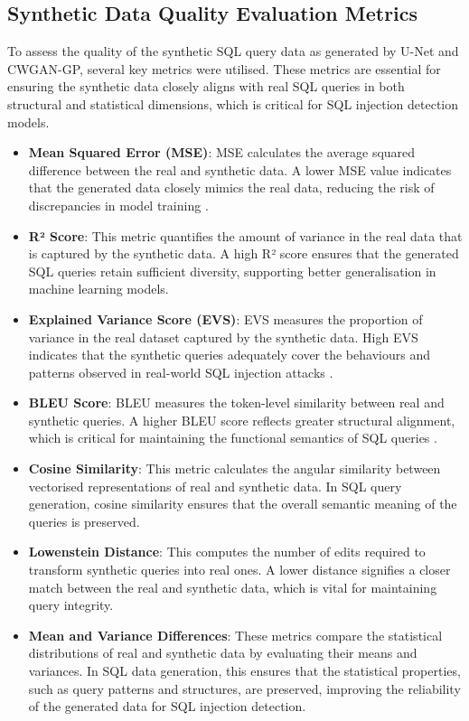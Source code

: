 \documentclass[journal]{IEEEtran}
\begin{document}
\subsection{Synthetic Data Quality Evaluation Metrics}

To assess the quality of the synthetic SQL query data as generated by U-Net and CWGAN-GP, several key metrics were utilised. These metrics are essential for ensuring the synthetic data closely aligns with real SQL queries in both structural and statistical dimensions, which is critical for SQL injection detection models.

\begin{itemize}
    \item \textbf{Mean Squared Error (MSE)}: MSE calculates the average squared difference between the real and synthetic data. A lower MSE value indicates that the generated data closely mimics the real data, reducing the risk of discrepancies in model training \cite{goldstein1999summarizing}.

    \item \textbf{R² Score}: This metric quantifies the amount of variance in the real data that is captured by the synthetic data. A high R² score ensures that the generated SQL queries retain sufficient diversity, supporting better generalisation in machine learning models.

    \item \textbf{Explained Variance Score (EVS)}: EVS measures the proportion of variance in the real dataset captured by the synthetic data. High EVS indicates that the synthetic queries adequately cover the behaviours and patterns observed in real-world SQL injection attacks \cite{goldstein1999summarizing}.

    \item \textbf{BLEU Score}: BLEU measures the token-level similarity between real and synthetic queries. A higher BLEU score reflects greater structural alignment, which is critical for maintaining the functional semantics of SQL queries \cite{goldstein1999summarizing}.

    \item \textbf{Cosine Similarity}: This metric calculates the angular similarity between vectorised representations of real and synthetic data. In SQL query generation, cosine similarity ensures that the overall semantic meaning of the queries is preserved.

    \item \textbf{Lowenstein Distance}: This computes the number of edits required to transform synthetic queries into real ones. A lower distance signifies a closer match between the real and synthetic data, which is vital for maintaining query integrity.

    \item \textbf{Mean and Variance Differences}: These metrics compare the statistical distributions of real and synthetic data by evaluating their means and variances. In SQL data generation, this ensures that the statistical properties, such as query patterns and structures, are preserved, improving the reliability of the generated data for SQL injection detection.

\end{itemize}
\end{document}

